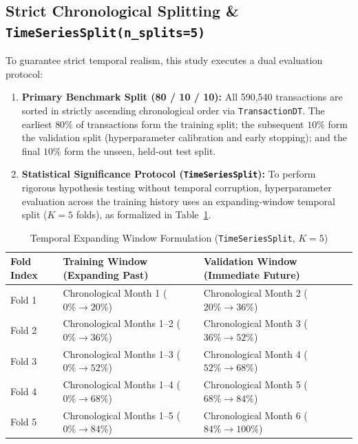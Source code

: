 \documentclass[11pt,a4paper]{article}
\begin{document}
\subsection{Strict Chronological Splitting \& \texttt{TimeSeriesSplit(n\_splits=5)}}
To guarantee strict temporal realism, this study executes a dual evaluation protocol:
\begin{enumerate}[leftmargin=*]
    \item \textbf{Primary Benchmark Split (80 / 10 / 10):} All 590,540 transactions are sorted in strictly ascending chronological order via \texttt{TransactionDT}. The earliest $80\%$ of transactions form the training split; the subsequent $10\%$ form the validation split (hyperparameter calibration and early stopping); and the final $10\%$ form the unseen, held-out test split.
    \item \textbf{Statistical Significance Protocol (\texttt{TimeSeriesSplit}):} To perform rigorous hypothesis testing without temporal corruption, hyperparameter evaluation across the training history uses an expanding-window temporal split ($K=5$ folds), as formalized in Table~\ref{tab:temporal_cv}.
\end{enumerate}

\begin{table}[htbp]
\centering
\small
\caption{Temporal Expanding Window Formulation (\texttt{TimeSeriesSplit}, $K=5$)}
\label{tab:temporal_cv}
\begin{tabular}{lll}
\toprule
\textbf{Fold Index} & \textbf{Training Window (Expanding Past)} & \textbf{Validation Window (Immediate Future)} \\
\midrule
Fold 1 & Chronological Month 1 ($0\% \to 20\%$) & Chronological Month 2 ($20\% \to 36\%$) \\
Fold 2 & Chronological Months 1--2 ($0\% \to 36\%$) & Chronological Month 3 ($36\% \to 52\%$) \\
Fold 3 & Chronological Months 1--3 ($0\% \to 52\%$) & Chronological Month 4 ($52\% \to 68\%$) \\
Fold 4 & Chronological Months 1--4 ($0\% \to 68\%$) & Chronological Month 5 ($68\% \to 84\%$) \\
Fold 5 & Chronological Months 1--5 ($0\% \to 84\%$) & Chronological Month 6 ($84\% \to 100\%$) \\
\bottomrule
\end{tabular}
\end{table}
\end{document}
